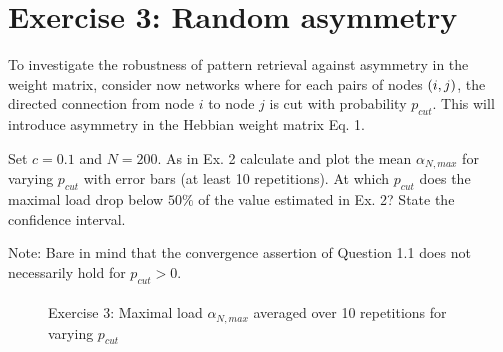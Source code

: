 \section{Exercise 3: Random asymmetry}

\begin{itshape}
\small
To investigate the robustness of pattern retrieval against asymmetry in the weight matrix, consider now networks where for each pairs of nodes $\left(i, j\right)$, the directed connection from node $i$ to node $j$ is cut with probability $p_{cut}$. This will introduce asymmetry in the Hebbian weight matrix Eq. 1.

Set $c=0.1$ and $N = 200$. As in Ex. 2 calculate and plot the mean $\alpha_{N,max}$ for varying $p_{cut}$ with error bars (at least 10 repetitions). At which $p_{cut}$ does the maximal load drop below $50\%$ of the value estimated in Ex. 2? State the confidence interval.

Note: Bare in mind that the convergence assertion of Question 1.1 does not necessarily hold for $p_{cut} > 0$.
\end{itshape}

\paragraph*{}

\begin{wrapfigure}{r}{0.5\textwidth}
  \vspace{-20pt}
  \begin{center}
  \end{center}
  \vspace{-20pt}
  \caption{Exercise 3: Maximal load $\alpha_{N,max}$ averaged over 10 repetitions for varying $p_{cut}$ }
  \label{fig:exercise3}
  \vspace{-10pt}
\end{wrapfigure}



